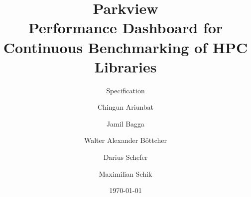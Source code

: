 \documentclass{beamer}
\title{\Huge Parkview \\ \Large Performance Dashboard for Continuous Benchmarking of HPC Libraries}
\subtitle{Specification}
\author{Chingun Ariunbat \and Jamil Bagga \and Walter Alexander Böttcher \and Darius Schefer \and Maximilian Schik}
\date{\today}
\begin{document}
\begin{frame}
    \titlepage
\end{frame}






\end{document}
